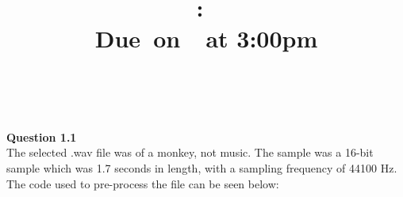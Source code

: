 \documentclass{article}
\title{
    \vspace{2in}
    \textmd{\textbf{\hmwkClass:\ \hmwkTitle}}\\
    \normalsize\vspace{0.1in}\small{Due\ on\ \hmwkDueDate\ at 3:00pm}\\
    \vspace{0.1in}\large{\textit{\hmwkClassInstructor\ \hmwkClassTime}}
    \vspace{3in}
}
\author{\textbf{\hmwkAuthorName}}
\date{}
\begin{document}
\maketitle

\pagebreak



    \textbf{Question 1.1}\\
    
    The selected .wav file was of a monkey, not music. The sample was a 16-bit sample which was 1.7 seconds in length, with a sampling frequency of 44100 $\si{\hertz}$. The code used to pre-process the file can be seen below:
    
\end{document}
